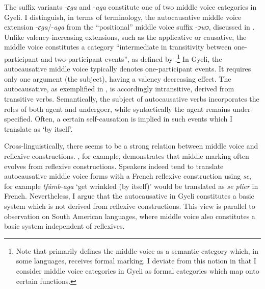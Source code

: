 The suffix variants -{\itshape ɛga} and -{\itshape aga} constitute one of two middle voice categories in Gyeli. I distinguish, in terms of terminology, the autocausative middle voice extension -{\itshape ɛga}/-{\itshape aga} from the ``positional'' middle voice suffix -{\itshape ɔwɔ}, discussed in . Unlike valency-increasing extensions, such as the applicative or causative, the middle voice constitutes a category ``intermediate  in  transitivity  between  one-participant  and  two-participant  events'', as defined by \citet[3]{kemmer93}.\footnote{Note that \citet{kemmer93} primarily defines the middle voice as a semantic category which, in some languages, receives formal marking. I deviate from this notion in that I consider middle voice categories in Gyeli as formal categories which map onto certain functions.} In Gyeli, the autocausative middle voice typically denotes one-participant events. It requires only one argument (the subject), having a valency decreasing effect. 
The autocausative, as exemplified in , is accordingly intransitive, derived from transitive verbs. Semantically, the subject of autocausative verbs incorporates the roles of both agent and undergoer, while syntactically the agent remains under-specified. Often, a certain self-causation is implied in such events which I translate as `by itself'.



Cross-linguistically, there seems to be a strong relation between middle voice and reflexive constructions. \citet{
kemmer93}, for example, demonstrates that middle marking often evolves from reflexive constructions. Speakers indeed tend to translate autocausative middle voice forms with a French reflexive construction using {\itshape se}, for example {\itshape tfúmb-aga} `get wrinkled (by itself)' would be translated as {\itshape se plier} in French. Nevertheless, I argue that the autocausative in Gyeli constitutes a basic system which is not derived from reflexive constructions. This view is parallel to  observation on South American languages, where middle voice also constitutes a basic system independent of reflexives. 

